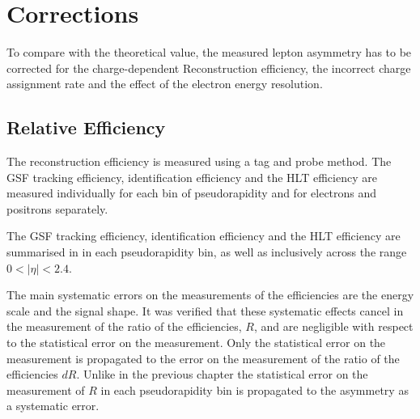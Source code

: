 \section{Corrections}

To compare with the theoretical value, the measured lepton asymmetry has to be
corrected for the charge-dependent Reconstruction efficiency, the incorrect charge
assignment rate and the effect of the electron energy resolution.

\subsection{Relative Efficiency}
The reconstruction efficiency is measured using a tag and probe method\cite{}.
The {GSF} tracking efficiency,
identification efficiency and the {HLT} efficiency are measured individually
for each bin of pseudorapidity and for electrons and positrons separately. 

The {GSF} tracking efficiency, identification efficiency and the {HLT}
efficiency are summarised in 
in each pseudorapidity bin, as well as inclusively
across the range $0<| \eta |< 2.4$. 

The main systematic errors on the measurements of the efficiencies are the
energy scale and the signal shape. It was verified that these systematic effects
cancel in the measurement of the ratio of the efficiencies, $R$, and are
negligible with respect to the statistical error on the measurement. Only the
statistical error on the measurement is propagated to the error on the
measurement of the ratio of the efficiencies $dR$.  Unlike in the previous
chapter the statistical error on the measurement of $R$ in each pseudorapidity
bin is propagated to the asymmetry as a systematic error. 

